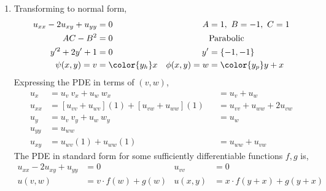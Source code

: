 \begin{enumerate}
    \item Transforming to normal form,
          \begin{align}
              u_{xx} - 2u_{xy} + u_{yy} & = 0                  &
              A                         & = 1,\ B = -1,\ C = 1   \\
              AC - B^2                  & = 0                  &
                                        & \text{Parabolic}       \\
              y'^2 + 2y' + 1            & = 0                  &
              y'                        & = \{-1, -1\}           \\
              \psi(x, y) = v            & = \color{y_h} x      &
              \phi(x, y) = w            & = \color{y_p} y + x
          \end{align}
          Expressing the PDE in terms of $ (v, w) $,
          \begin{align}
              u_{x}  & = u_v\ v_x + u_w\ w_x                            &
                     & = u_v + u_w                                        \\
              u_{xx} & = [u_{vv} + u_{wv}] (1) +  [u_{vw} + u_{ww}] (1) &
                     & = u_{vv} + u_{ww} + 2u_{vw}                        \\
              u_{y}  & = u_v\ v_y + u_w\ w_y                            &
                     & = u_w                                              \\
              u_{yy} & = u_{ww}                                           \\
              u_{xy} & = u_{wv}(1) + u_{ww}(1)                          &
                     & = u_{ww} + u_{vw}
          \end{align}
          The PDE in standard form for some sufficiently differentiable functions
          $ f, g $ is,
          \begin{align}
              u_{xx} - 2u_{xy} + u_{yy} & = 0                           &
              u_{vv}                    & = 0                             \\
              u(v, w)                   & = v \cdot f(w) + g(w)         &
              u(x, y)                   & = x \cdot f(y + x) + g(y + x)
          \end{align}


\end{enumerate}
